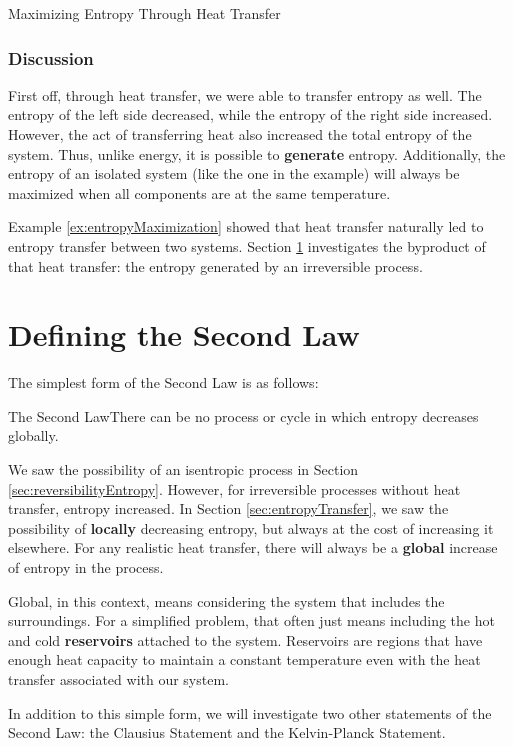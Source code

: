 \begin{example}[label=ex:entropyMaximization]{Maximizing Entropy Through Heat Transfer}
  \subsubsection*{Discussion}
  First off, through heat transfer, we were able to transfer entropy as well. The entropy of the left side decreased, while the entropy of the right side increased.  However, the act of transferring heat also increased the total entropy of the system.  Thus, unlike energy, it is possible to {\bf generate} entropy.  Additionally, the entropy of an isolated system (like the one in the example) will always be maximized when all components are at the same temperature.
\end{example}

Example \ref{ex:entropyMaximization} showed that heat transfer naturally led to entropy transfer between two systems.  Section \ref{sec:SecondLaw} investigates the byproduct of that heat transfer: the entropy generated by an irreversible process.

\section{Defining the Second Law} \label{sec:SecondLaw}
The simplest form of the Second Law is as follows:

\begin{quoteWithTitle}{The Second Law}{There can be no process or cycle in which entropy decreases globally.}
\end{quoteWithTitle}

We saw the possibility of an isentropic process in Section \ref{sec:reversibilityEntropy}.  However, for irreversible processes without heat transfer, entropy increased.  In Section \ref{sec:entropyTransfer}, we saw the possibility of {\bf locally} decreasing entropy, but always at the cost of increasing it elsewhere.  For any realistic heat transfer, there will always be a {\bf global} increase of entropy in the process.

Global, in this context, means considering the system that includes the surroundings.  For a simplified problem, that often just means including the hot and cold {\bf reservoirs} attached to the system.  Reservoirs are regions that have enough heat capacity to maintain a constant temperature even with the heat transfer associated with our system.

In addition to this simple form, we will investigate two other statements of the Second Law: the Clausius Statement and the Kelvin-Planck Statement.

